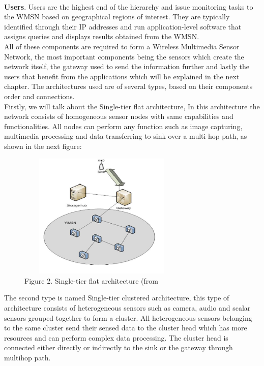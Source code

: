 \documentclass[conference]{IEEEtran}
\begin{document}
\\ \indent \textbf{Users}. Users are the highest end of the hierarchy and issue monitoring tasks to the WMSN based on geographical regions of interest. They are typically identified through their IP addresses and run application-level software that assigns queries and displays results obtained from the WMSN.
\\ \indent All of these components are required to form a Wireless Multimedia Sensor Network, the most important components being the sensors which create the network itself, the gateway used to send the information further and lastly the users that benefit from the applications which will be explained in the next chapter. The architectures used are of several types, based on their components order and connections.
\\ \indent Firstly, we will talk about the Single-tier flat architecture, In this architecture the network consists of homogeneous sensor nodes with same capabilities and functionalities. All nodes can perform any function such as image capturing, multimedia processing and data transferring to sink over a multi-hop path, as shown in the next figure:

\begin{figure}
    \includegraphics[width=8cm, height=6cm]{images/p2.png}
    \centering
    \caption{Figure 2. Single-tier flat architecture (from \citet{Inaf02}}
\end{figure}

\par \indent The second type is named Single-tier clustered architecture, this type of architecture consists of heterogeneous sensors such as camera, audio and scalar sensors grouped together to form a cluster. All heterogeneous sensors belonging to the same cluster send their sensed data to the cluster head which has more resources and can perform complex data processing. The cluster head is connected either directly or indirectly to the sink or the gateway through multihop path.
\end{document}
